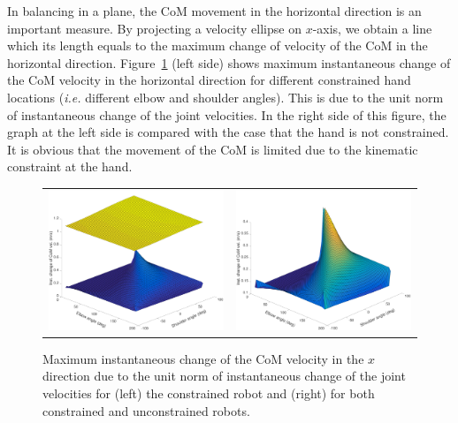 \documentclass[final,5p,twocolumn]{elsarticle}
\begin{document}
In balancing in a plane, the CoM movement in the horizontal direction is an
important measure. By projecting a velocity ellipse on $x$-axis, we obtain a
line which its length equals to the maximum change of velocity of the CoM in
the horizontal direction. Figure~\ref{type2} (left side) shows maximum
instantaneous change of the CoM velocity in the horizontal direction for
different constrained hand locations (\textit{i.e.} different elbow and shoulder
angles). This is due to the unit norm of instantaneous change of the joint
velocities. In the right side of this figure, the graph at the left side is
compared with the case that the hand is not constrained. It is obvious that
the movement of the CoM is limited due to the kinematic constraint at the
hand.
\begin{figure}[!t]
  \centering
  \begin{tabular}{lr}
    \includegraphics[width=0.5\linewidth]{images/type2_2.pdf}
    &  
    \includegraphics[width=0.5\linewidth]{images/type2.pdf}
  \end{tabular}
  \caption{Maximum instantaneous change of the CoM velocity in the $x$
    direction due to the unit norm of instantaneous change of the joint
    velocities for (left) the constrained robot and (right) for both
    constrained and unconstrained robots.}
  \label{type2}
\end{figure}
\end{document}
